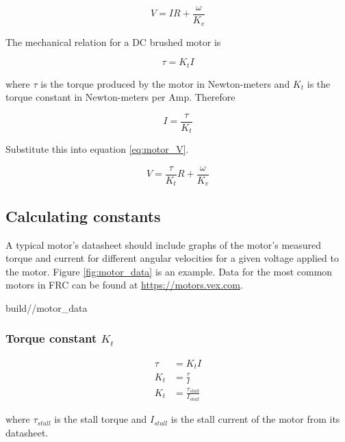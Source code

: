 \begin{equation}
  V = IR + \frac{\omega}{K_v} \label{eq:motor_V}
\end{equation}

The mechanical relation for a DC brushed motor is

\begin{equation}
  \tau = K_t I
\end{equation}

where $\tau$ is the torque produced by the motor in Newton-meters and $K_t$ is
the torque constant in Newton-meters per Amp. Therefore

\begin{equation*}
  I = \frac{\tau}{K_t}
\end{equation*}

Substitute this into equation \eqref{eq:motor_V}.

\begin{equation}
  V = \frac{\tau}{K_t} R + \frac{\omega}{K_v} \label{eq:motor_tau_V}
\end{equation}

\subsection{Calculating constants}

A typical motor's datasheet should include graphs of the motor's measured torque
and current for different angular velocities for a given voltage applied to the
motor. Figure \ref{fig:motor_data} is an example. Data for the most common
motors in FRC can be found at \url{https://motors.vex.com}.

\begin{svg}{build/\chapterpath/motor_data}
  \caption{Example motor datasheet for 775pro}
  \label{fig:motor_data}
\end{svg}

\subsubsection{Torque constant $K_t$}

\begin{align}
  \tau &= K_t I \nonumber \\
  K_t &= \frac{\tau}{I} \nonumber \\
  K_t &= \frac{\tau_{stall}}{I_{stall}}
\end{align}

where $\tau_{stall}$ is the stall torque and $I_{stall}$ is the stall current of
the motor from its datasheet.

